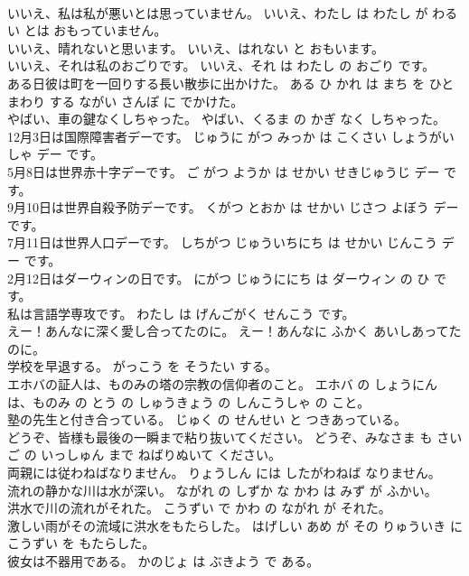 \documentclass[8pt]{extreport}
\begin{document}
\begin{CJK}{UTF8}{min}
\\	いいえ、私は私が悪いとは思っていません。	いいえ、わたし は わたし が わるい とは おもっていません。	
\\	いいえ、晴れないと思います。	いいえ、はれない と おもいます。	
\\	いいえ、それは私のおごりです。	いいえ、それ は わたし の おごり です。	
\\	ある日彼は町を一回りする長い散歩に出かけた。	ある ひ かれ は まち を ひとまわり する ながい さんぽ に でかけた。	
\\	やばい、車の鍵なくしちゃった。	やばい、くるま の かぎ なく しちゃった。	
\\	12月3日は国際障害者デーです。	じゅうに がつ みっか は こくさい しょうがいしゃ デー です。	
\\	5月8日は世界赤十字デーです。	ご がつ ようか は せかい せきじゅうじ デー です。	
\\	9月10日は世界自殺予防デーです。	くがつ とおか は せかい じさつ よぼう デー です。	
\\	7月11日は世界人口デーです。	しちがつ じゅういちにち は せかい じんこう デー です。	
\\	2月12日はダーウィンの日です。	にがつ じゅうににち は ダーウィン の ひ です。	
\\	私は言語学専攻です。	わたし は げんごがく せんこう です。	
\\	えー！あんなに深く愛し合ってたのに。	えー！あんなに ふかく あいしあってた のに。	
\\	学校を早退する。	がっこう を そうたい する。	
\\	エホバの証人は、ものみの塔の宗教の信仰者のこと。	エホバ の しょうにん は、ものみ の とう の しゅうきょう の しんこうしゃ の こと。	
\\	塾の先生と付き合っている。	じゅく の せんせい と つきあっている。	
\\	どうぞ、皆様も最後の一瞬まで粘り抜いてください。	どうぞ、みなさま も さいご の いっしゅん まで ねばりぬいて ください。	
\\	両親には従わねばなりません。	りょうしん には したがわねば なりません。	
\\	流れの静かな川は水が深い。	ながれ の しずか な かわ は みず が ふかい。	
\\	洪水で川の流れがそれた。	こうずい で かわ の ながれ が それた。	
\\	激しい雨がその流域に洪水をもたらした。	はげしい あめ が その りゅういき に こうずい を もたらした。	
\\	彼女は不器用である。	かのじょ は ぶきよう で ある。	

\end{CJK}
\end{document}
